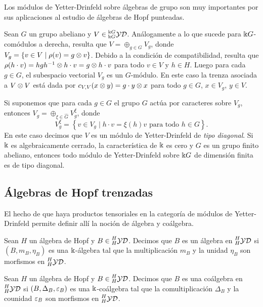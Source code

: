 \documentclass[a4paper,oneside,fleqn,11pt,../tesis.tex]{subfiles}
\newcommand{\yetter}{\prescript{H}{H}{\mathcal{YD}}}
\newcommand{\yetterg}{\prescript{\field G}{\field G}{\mathcal{YD}}}
\begin{document}
Los módulos de Yetter-Drinfeld sobre álgebras de grupo son muy importantes por sus aplicaciones al estudio de álgebras de Hopf punteadas.
\begin{example}\label{examplegroupyetter}
	Sean $G$ un grupo abeliano y $V \in \yetterg$. Análogamente a lo que sucede para $\Bbbk G$-comódulos a derecha,
	resulta que $V = \oplus_{g \in G} V_g$, donde $V_g = \left\lbrace v \in V \mid \rho(v) = g \otimes v \right\rbrace$.
	Debido a la condición de compatibilidad, resulta que
	$\rho(h \cdot v) = hgh^{-1} \otimes h \cdot v = g \otimes h \cdot v$ para todo $v \in V$ y $h \in H$.
	Luego para cada $g \in G$, el subespacio vectorial $V_g$ es un $G$-módulo.
	En este caso la trenza asociada a $V \otimes V$ está dada por $c_{V, V}(x \otimes y) = g \cdot y \otimes x$ para todo $g \in G$, $x \in V_g$,
	$y \in V$.
	
	Si suponemos que para cada $g \in G$ el grupo $G$ actúa por caracteres sobre $V_g$, entonces $V_g = \oplus_{\xi \in \hat{G}} V_{g}^{\xi}$,
	donde
	\[
		V_{g}^{\xi} = \left\lbrace v \in V_g \mid h \cdot v = \xi(h)v \text{ para todo } h \in G \right\rbrace.	
	\]
	En este caso decimos que $V$ es un módulo de Yetter-Drinfeld de \emph{tipo diagonal}.
	Si $\Bbbk$ es algebraicamente cerrado, la característica de $\Bbbk$ es cero
	y $G$ es un grupo finito abeliano, entonces todo módulo de Yetter-Drinfeld sobre $\Bbbk G$ de dimensión finita es de tipo diagonal.
\end{example}

\subsection{Álgebras de Hopf trenzadas}
El hecho de que haya productos tensoriales en la categoría de módulos de Yetter-Drinfeld permite definir allí la noción de álgebra y coálgebra.

\begin{definition}
	Sean $H$ un álgebra de Hopf y $B \in \yetter$. Decimos que $B$ es un álgebra en $\yetter$ si $\left(B,m_B,\eta_B\right)$ es una $\Bbbk$-álgebra
	tal que la multiplicación $m_B$ y la unidad $\eta_B$ son morfismos en $\yetter$.
\end{definition}

\begin{definition}
	Sean $H$ un álgebra de Hopf y $B \in \yetter$. Decimos que $B$ es una coálgebra en $\yetter$ si
	$\left(B,\Delta_B,\varepsilon_B\right)$ es una $\Bbbk$-coálgebra
	tal que la comultiplicación $\Delta_B$ y la counidad $\varepsilon_B$ son morfismos en $\yetter$.
\end{definition}
\end{document}
